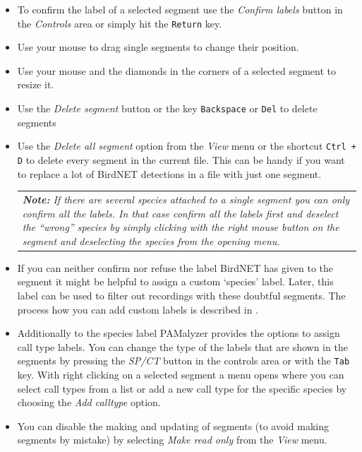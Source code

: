 \documentclass{scrartcl}
\begin{document}
\begin{itemize}
	\item To confirm the label of a selected segment use the \textit{Confirm labels} button in the \textit{Controls} area or simply hit the \texttt{Return} key.
	\item Use your mouse to drag single segments to change their position.
	\item Use your mouse and the diamonds in the corners of a selected segment to resize it.
	\item Use the \textit{Delete segment} button or the key \texttt{Backspace} or \texttt{Del} to delete segments
	\item Use the \textit{Delete all segment} option from the \textit{View} menu or the shortcut \texttt{Ctrl + D} to delete every segment in the current file. 
		This can be handy if you want to replace a lot of BirdNET detections in a file with just one segment.
	\begin{table}[ht!]
		\centering
		\begin{tabular}{p{}}
			\textit{\textbf{Note:} If there are several species attached to a single segment you can only confirm all the labels. In that case confirm all the labels first and deselect the ``wrong'' species by simply clicking with the right mouse button on the segment and deselecting the species from the opening menu.}\\
		\end{tabular}
	\end{table}
	\item If you can neither confirm nor refuse the label BirdNET has given to the segment it might be helpful to assign a custom `species' label. Later, this label can be used to filter out recordings with these doubtful segments. The process how you can add custom labels is described in .
	\item Additionally to the species label PAMalyzer provides the options to assign call type labels. 
		You can change the type of the labels that are shown in the segments by pressing the \textit{SP/CT} button in the controls area or with the \texttt{Tab} key.
		With right clicking on a selected segment a menu opens where you can select call types from a list or add a new call type for the specific species by choosing the \textit{Add calltype} option.
 	\item You can disable the making and updating of segments (to avoid making segments by mistake) by selecting \textit{Make read only} from the \textit{View} menu.
\end{itemize}
\end{document}
